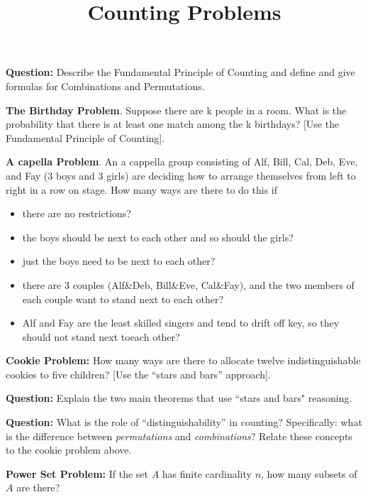 




\title{Counting Problems}
\date{}
\maketitle

\textbf{Question:} Describe the Fundamental Principle of Counting and define and give formulas for Combinations and Permutations.
\n

\textbf{The Birthday Problem}. Suppose there are k people in a room. What is the probability that there is at least one match among the k birthdays? [Use the Fundamental Principle of Counting].
\nn

\textbf{A capella Problem}. An a cappella group consisting of Alf, Bill, Cal, Deb, Eve, and Fay (3 boys and 3 girls) are deciding how to arrange themselves from left to right in a row on stage. How many ways are there to do this if
\begin{itemize}
\item there are no restrictions?
\item the boys should be next to each other and so should the girls?
\item just the boys need to be next to each other?
\item there are 3 couples (Alf\&Deb, Bill\&Eve, Cal\&Fay), and the two members of each couple want to stand next to each other?
\item Alf and Fay are the least skilled singers and tend to drift off key, so they should not stand next toeach other?
\nn
\end{itemize}


\textbf{Cookie Problem:} How many ways are there to allocate twelve indistinguishable cookies to five children? [Use the ``stars and bars'' approach].
\n

\textbf{Question:} Explain the two main theorems that use ``stars and bars" reasoning.
\n

\textbf{Question:} What is the role of ``distinguishability'' in counting? Specifically: what is the difference between \emph{permutations} and \emph{combinations}? Relate these concepts to the cookie problem above.
\n

\textbf{Power Set Problem:} If the set $A$ has finite cardinality $n$, how many subsets of $A$ are there?




\vspace{.3 in}

